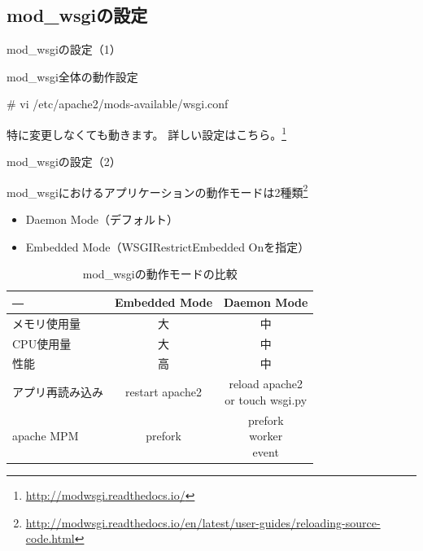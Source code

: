 \subsection{mod\_wsgiの設定}

\begin{frame}[containsverbatim]{mod\_wsgiの設定（1）}

mod\_wsgi全体の動作設定

\begin{commandline}
# vi /etc/apache2/mods-available/wsgi.conf
\end{commandline}

特に変更しなくても動きます。
詳しい設定はこちら。\footnote{\url{http://modwsgi.readthedocs.io/}}
\end{frame}


\begin{frame}[containsverbatim]{mod\_wsgiの設定（2）}

mod\_wsgiにおけるアプリケーションの動作モードは2種類\footnote{\url{http://modwsgi.readthedocs.io/en/latest/user-guides/reloading-source-code.html}}
  
\begin{itemize}
  \item Daemon Mode（デフォルト）
  \item Embedded Mode（WSGIRestrictEmbedded Onを指定）
\end{itemize}

\begin{table}[htb]
  \caption{mod\_wsgiの動作モードの比較}
  \begin{tabular}{|l|c|c|}
    \hline
    ― & Embedded Mode & Daemon Mode \\
    \hline \hline
    メモリ使用量 & 大 & 中 \\
    \hline
    CPU使用量 & 大 & 中 \\
    \hline
    性能 & 高 & 中 \\
    \hline
    アプリ再読み込み & restart apache2 & \shortstack{reload apache2 \\ or touch wsgi.py} \\
    \hline
    apache MPM & prefork & \shortstack{prefork \\ worker \\ event} \\
    \hline
  \end{tabular}
\end{table}

\end{frame}


